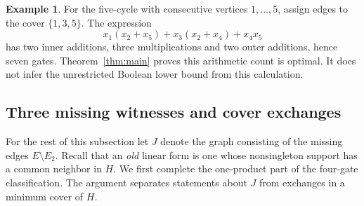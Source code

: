 \documentclass[11pt]{article}
\theoremstyle{definition}
\newtheorem{example}[theorem]{Example}
\theoremstyle{remark}
\begin{document}
\begin{example}
For the five-cycle with consecutive vertices $1,\ldots,5$, assign edges to the cover $\{1,3,5\}$. The expression
\[
 x_1(x_2+x_5)+x_3(x_2+x_4)+x_4x_5
\]
has two inner additions, three multiplications and two outer additions, hence seven gates. Theorem~\ref{thm:main} proves this arithmetic count is optimal. It does not infer the unrestricted Boolean lower bound from this calculation.
\end{example}

\subsection{Three missing witnesses and cover exchanges}

For the rest of this subsection let $J$ denote the graph consisting of the missing edges $E\setminus E_2$. Recall that an \emph{old} linear form is one whose nonsingleton support has a common neighbor in $H$. We first complete the one-product part of the four-gate classification. The argument separates statements about $J$ from exchanges in a minimum cover of $H$.
\end{document}
